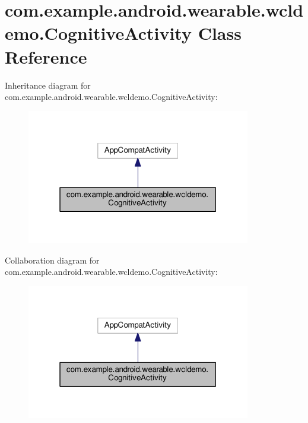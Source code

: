 \hypertarget{classcom_1_1example_1_1android_1_1wearable_1_1wcldemo_1_1CognitiveActivity}{}\section{com.\+example.\+android.\+wearable.\+wcldemo.\+Cognitive\+Activity Class Reference}
\label{classcom_1_1example_1_1android_1_1wearable_1_1wcldemo_1_1CognitiveActivity}


Inheritance diagram for com.\+example.\+android.\+wearable.\+wcldemo.\+Cognitive\+Activity\+:
\nopagebreak
\begin{figure}[H]
\begin{center}
\leavevmode
\includegraphics[width=277pt]{d1/d46/classcom_1_1example_1_1android_1_1wearable_1_1wcldemo_1_1CognitiveActivity__inherit__graph}
\end{center}
\end{figure}


Collaboration diagram for com.\+example.\+android.\+wearable.\+wcldemo.\+Cognitive\+Activity\+:
\nopagebreak
\begin{figure}[H]
\begin{center}
\leavevmode
\includegraphics[width=277pt]{dd/d2a/classcom_1_1example_1_1android_1_1wearable_1_1wcldemo_1_1CognitiveActivity__coll__graph}
\end{center}
\end{figure}
